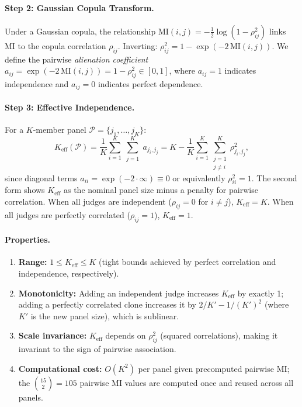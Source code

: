 \paragraph{Step 2: Gaussian Copula Transform.} Under a Gaussian copula, the relationship $\mathrm{MI}(i,j) = -\frac{1}{2}\log(1 - \rho_{ij}^2)$ links MI to the copula correlation $\rho_{ij}$. Inverting: $\rho_{ij}^2 = 1 - \exp(-2\,\mathrm{MI}(i,j))$. We define the pairwise \emph{alienation coefficient} $a_{ij} = \exp(-2\,\mathrm{MI}(i,j)) = 1 - \rho_{ij}^2 \in [0, 1]$, where $a_{ij}{=}1$ indicates independence and $a_{ij}{=}0$ indicates perfect dependence.

\paragraph{Step 3: Effective Independence.} For a $K$-member panel $\mathcal{P} = \{j_1, \ldots, j_K\}$:
\begin{equation}
K_{\mathrm{eff}}(\mathcal{P}) = \frac{1}{K} \sum_{i=1}^{K} \sum_{\substack{j=1}}^{K} a_{j_i, j_j} = K - \frac{1}{K} \sum_{i=1}^{K} \sum_{\substack{j=1 \\ j \neq i}}^{K} \rho_{j_i, j_j}^2,
\label{eq:keff_full}
\end{equation}
since diagonal terms $a_{ii}{=}\exp(-2 \cdot \infty) \equiv 0$ or equivalently $\rho_{ii}^2{=}1$. The second form shows $K_{\mathrm{eff}}$ as the nominal panel size minus a penalty for pairwise correlation. When all judges are independent ($\rho_{ij}{=}0$ for $i{\neq}j$), $K_{\mathrm{eff}}{=}K$. When all judges are perfectly correlated ($\rho_{ij}{=}1$), $K_{\mathrm{eff}}{=}1$.

\paragraph{Properties.}
\begin{enumerate}
\item \textbf{Range:} $1 \leq K_{\mathrm{eff}} \leq K$ (tight bounds achieved by perfect correlation and independence, respectively).
\item \textbf{Monotonicity:} Adding an independent judge increases $K_{\mathrm{eff}}$ by exactly 1; adding a perfectly correlated clone increases it by $2/K' - 1/(K')^2$ (where $K'$ is the new panel size), which is sublinear.
\item \textbf{Scale invariance:} $K_{\mathrm{eff}}$ depends on $\rho_{ij}^2$ (squared correlations), making it invariant to the sign of pairwise association.
\item \textbf{Computational cost:} $O(K^2)$ per panel given precomputed pairwise MI; the $\binom{15}{2}{=}105$ pairwise MI values are computed once and reused across all panels.
\end{enumerate}


